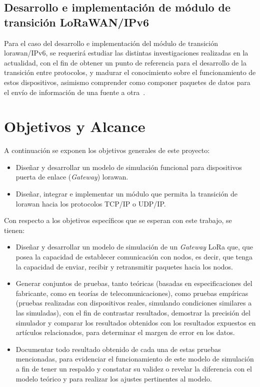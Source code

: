 \begin{justify}
\subsection{Desarrollo e implementación de módulo de transición LoRaWAN/IPv6} 
Para el caso del desarrollo e implementación del módulo de transición \gls{lorawan}/IPv6, se requerirá estudiar las distintas investigaciones realizadas en la actualidad, con el fin de obtener un punto de referencia para el desarrollo de la transición entre protocolos, y madurar el conocimiento sobre el funcionamiento de estos dispositivos, asimismo comprender como componer paquetes de datos para el envío de información de una fuente a otra~\cite{Juha}.

\section{Objetivos y Alcance}
A continuación se exponen los objetivos generales de este proyecto:\\
\begin{itemize}
\item Diseñar y desarrollar un modelo de simulación funcional para dispositivos puerta de enlace (\textit{Gateway}) \gls{lorawan}.
\item Diseñar, integrar e implementar un módulo que permita la transición de \gls{lorawan} hacia los protocolos TCP/IP o UDP/IP.
\end{itemize}
Con respecto a los objetivos específicos que se esperan con este trabajo, se tienen:\
\begin{itemize}
\item Diseñar y desarrollar un modelo de simulación de un \textit{Gateway} LoRa que, que posea la capacidad de establecer comunicación con nodos, es decir, que tenga la capacidad de enviar, recibir y retransmitir paquetes hacia los nodos.
\item Generar conjuntos de pruebas, tanto teóricas (basadas en especificaciones del fabricante, como en teorías de telecomunicaciones), como pruebas empíricas (pruebas realizadas con dispositivos reales, simulando condiciones similares a las simuladas), con el fin de contrastar resultados, demostrar la precisión del simulador y comparar los resultados obtenidos con los resultados expuestos en artículos relacionados, para determinar el margen de error en los datos.
\item Documentar todo resultado obtenido de cada una de estas pruebas mencionadas, para evidenciar el funcionamiento de este modelo de simulación a fin de tener un respaldo y constatar su validez o revelar la diferencia con el modelo teórico y para realizar los ajustes pertinentes al modelo.

\end{itemize}
\end{justify}
